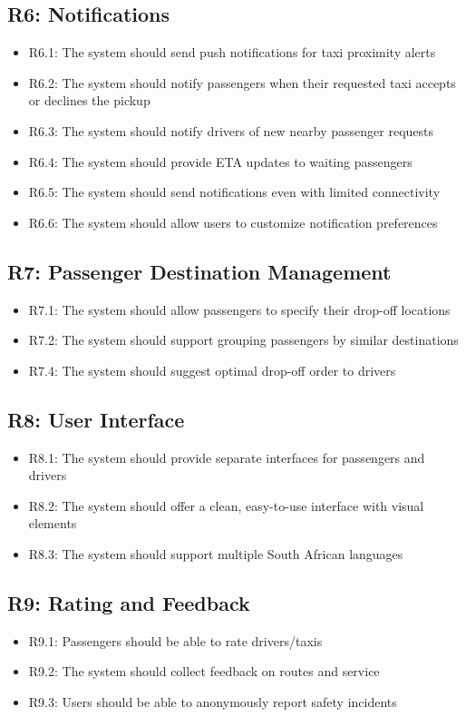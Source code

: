\documentclass[a4paper,12pt]{article}
\begin{document}
\subsection*{R6: Notifications}
\begin{itemize}
    \item R6.1: The system should send push notifications for taxi proximity alerts
    \item R6.2: The system should notify passengers when their requested taxi accepts or declines the pickup
    \item R6.3: The system should notify drivers of new nearby passenger requests
    \item R6.4: The system should provide ETA updates to waiting passengers 
    \item R6.5: The system should send notifications even with limited connectivity 
    \item R6.6: The system should allow users to customize notification preferences
\end{itemize}

\subsection*{R7: Passenger Destination Management}
\begin{itemize}
    \item R7.1: The system should allow passengers to specify their drop-off locations
    \item R7.2: The system should support grouping passengers by similar destinations
    \item R7.4: The system should suggest optimal drop-off order to drivers
\end{itemize}

\subsection*{R8: User Interface}
\begin{itemize}
    \item R8.1: The system should provide separate interfaces for passengers and drivers
    \item R8.2: The system should offer a clean, easy-to-use interface with visual elements
    \item R8.3: The system should support multiple South African languages 
\end{itemize}

\subsection*{R9: Rating and Feedback}
\begin{itemize}
    \item R9.1: Passengers should be able to rate drivers/taxis
    \item R9.2: The system should collect feedback on routes and service
    \item R9.3: Users should be able to anonymously report safety incidents
\end{itemize}
\end{document}
